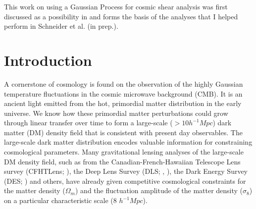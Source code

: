  
This work on using a Gaussian Process for cosmic shear analysis 
was first discussed as a possibility in  \citep{Schneider2014}  and 
forms the basis of the analyses that I helped perform 
in Schneider et al. (in prep.). 

\section{Introduction} 

A cornerstone of cosmology is found on the 
observation of the highly Gaussian temperature fluctuations in the cosmic microwave 
background (CMB). It is an ancient light emitted from the hot, primordial matter distribution 
in the early universe. 
We know how these primordial matter perturbations could grow 
through linear transfer over time to form a large-scale ($> 10 h^{-1} Mpc$) 
dark matter (DM) density field that is consistent with present
day observables. The large-scale dark matter distribution  
 encodes valuable information for constraining cosmological
parameters. Many gravitational lensing analyses of the large-scale DM density field, such as from
the Canadian-French-Hawaiian Telescope Lens survey (CFHTLens;
\citealt{Kilbinger2013}), the Deep Lens Survey
(DLS; \citealt{Jee2013a}, \citealt{Wittman2002}), the Dark Energy Survey 
(DES; \citealt{Abbott2016}) and others, 
have already given competitive cosmological constraints for 
 the matter density ($\Omega_m$) and the fluctuation amplitude 
of the matter density ($\sigma_8$) on a particular characteristic scale (8
$h^{-1} Mpc$). 


